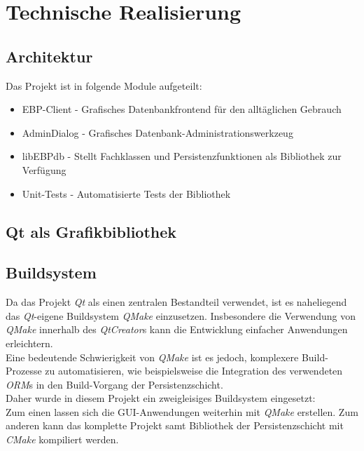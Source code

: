\section{Technische Realisierung}

\subsection{Architektur}
Das Projekt ist in folgende Module aufgeteilt:
\begin{itemize}
	\item EBP-Client - Grafisches Datenbankfrontend für den alltäglichen Gebrauch
	\item AdminDialog - Grafisches Datenbank-Administrationswerkzeug
	\item libEBPdb - Stellt Fachklassen und Persistenzfunktionen als Bibliothek zur Verfügung
	\item Unit-Tests - Automatisierte Tests der Bibliothek
\end{itemize}

\newpage

\subsection{Qt als Grafikbibliothek}

\newpage

\subsection{Buildsystem}
Da das Projekt \textit{Qt} als einen zentralen Bestandteil verwendet, ist es naheliegend das \textit{Qt}-eigene Buildsystem \textit{QMake} einzusetzen. Insbesondere die Verwendung von \textit{QMake} innerhalb des \textit{QtCreator}s kann die Entwicklung einfacher Anwendungen erleichtern.\\
Eine bedeutende Schwierigkeit von \textit{QMake} ist es jedoch, komplexere Build-Prozesse zu automatisieren, wie beispielsweise die Integration des verwendeten \textit{ORM}s in den Build-Vorgang der Persistenzschicht.\\
Daher wurde in diesem Projekt ein zweigleisiges Buildsystem eingesetzt:\\
Zum einen lassen sich die GUI-Anwendungen weiterhin mit \textit{QMake} erstellen. Zum anderen kann das komplette Projekt samt Bibliothek der Persistenzschicht mit \textit{CMake} kompiliert werden.\\

\newpage

